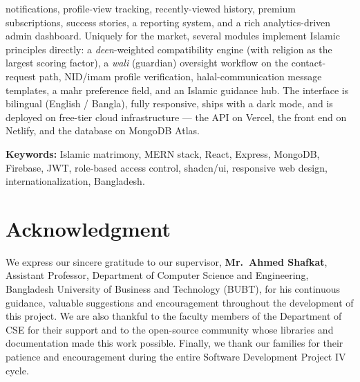 \documentclass[12pt,a4paper]{report}
\begin{document}
notifications, profile-view tracking, recently-viewed history, premium
subscriptions, success stories, a reporting system, and a rich analytics-driven
admin dashboard. Uniquely for the market, several modules implement Islamic
principles directly: a \emph{deen}-weighted compatibility engine (with religion
as the largest scoring factor), a \emph{wali} (guardian) oversight workflow on
the contact-request path, NID/imam profile verification, halal-communication
message templates, a mahr preference field, and an Islamic guidance hub. The interface is bilingual (English / Bangla), fully
responsive, ships with a dark mode, and is deployed on free-tier cloud
infrastructure --- the API on Vercel, the front end on Netlify, and the database
on MongoDB Atlas.

\vspace{1em}
\noindent\textbf{Keywords:} Islamic matrimony, MERN stack, React, Express,
MongoDB, Firebase, JWT, role-based access control, shadcn/ui, responsive web
design, internationalization, Bangladesh.

\chapter*{Acknowledgment}
\noindent
We express our sincere gratitude to our supervisor, \textbf{Mr.\ Ahmed Shafkat},
Assistant Professor, Department of Computer Science and Engineering, Bangladesh
University of Business and Technology (BUBT), for his continuous guidance,
valuable suggestions and encouragement throughout the development of this
project. We are also thankful to the faculty members of the Department of CSE
for their support and to the open-source community whose libraries and
documentation made this work possible. Finally, we thank our families for their
patience and encouragement during the entire Software Development Project IV
cycle.

\tableofcontents
\cleardoublepage
{}
\listoffigures
\cleardoublepage
{}
\listoftables
\cleardoublepage


\end{document}
